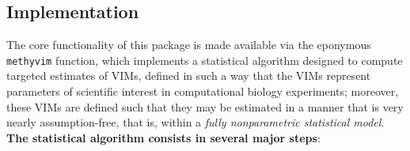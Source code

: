 \documentclass[9pt,a4paper,]{extarticle}
\theoremstyle{definition}
\theoremstyle{definition}
\theoremstyle{definition}
\theoremstyle{remark}
\begin{document}
\hypertarget{implementation}{%
\subsection{Implementation}\label{implementation}}

The core functionality of this package is made available via the eponymous
\texttt{methyvim} function, which implements a statistical algorithm designed to
compute targeted estimates of VIMs, defined in such a way that the VIMs
represent parameters of scientific interest in computational biology
experiments; moreover, these VIMs are defined such that they may be estimated in
a manner that is very nearly assumption-free, that is, within a \emph{fully
nonparametric statistical model}. \textbf{The statistical algorithm consists in
several major steps}:
\end{document}
